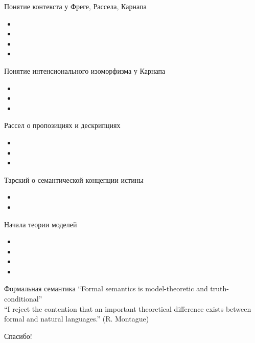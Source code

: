 \documentclass{beamer}
\begin{document}
\begin{frame}{Понятие контекста у Фреге, Рассела, Карнапа}
  \begin{itemize}
    \item 
    \item 
    \item 
    \item 
  \end{itemize}
\end{frame}

\begin{frame}{Понятие интенсионального изоморфизма у Карнапа}
  \begin{itemize}
    \item 
    \item 
    \item 
  \end{itemize}
\end{frame}

\begin{frame}{Рассел о пропозициях и дескрипциях}
  \begin{itemize}
    \item 
    \item 
    \item 
  \end{itemize}
\end{frame}

\begin{frame}{Тарский о семантической концепции истины}
  \begin{itemize}
    \item 
    \item 
  \end{itemize}
\end{frame}

\begin{frame}{Начала теории моделей}
  \begin{itemize}
    \item 
    \item 
    \item 
    \item 
  \end{itemize}
\end{frame}


\begin{frame}{Формальная семантика}
``Formal semantics is model-theoretic and truth-conditional''\\
\bigskip
``I reject the contention that an important theoretical difference exists between formal and natural languages.'' (R. Montague) 
\end{frame}


\begin{frame}{}
    \thispagestyle{empty}
    \begin{center}
        {\large Спасибо!}
    \end{center}
\end{frame}


\end{document}
